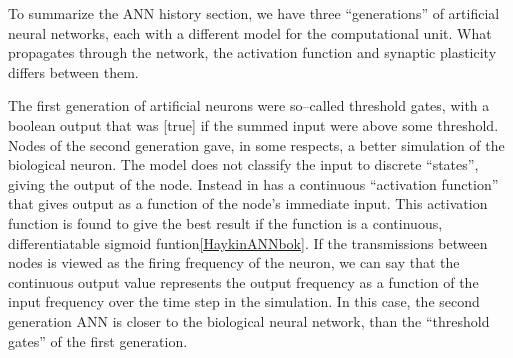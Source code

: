 
To summarize the ANN history section,  we have three ``generations'' of artificial neural networks, each with a different model for the computational unit. %
What propagates through the network, the activation function and synaptic plasticity differs between them. 


The first generation of artificial neurons were so--called threshold gates, with a boolean output that was [true] if the summed input were above some threshold.
Nodes of the second generation gave, in some respects, a better simulation of the biological neuron. %
The model does not classify the input to discrete ``states'', giving the output of the node. 
Instead in has a continuous ``activation function'' that gives output as a function of the node's immediate input.
%
This activation function is found to give the best result if the function is a continuous, differentiatable sigmoid funtion\ref{HaykinANNbok}.
If the transmissions between nodes is viewed as the firing frequency of the neuron, we can say that the continuous output value represents the output frequency as a function of the input frequency over the time step in the simulation.
In this case, the second generation ANN is closer to the biological neural network, than the ``threshold gates'' of the first generation. %


